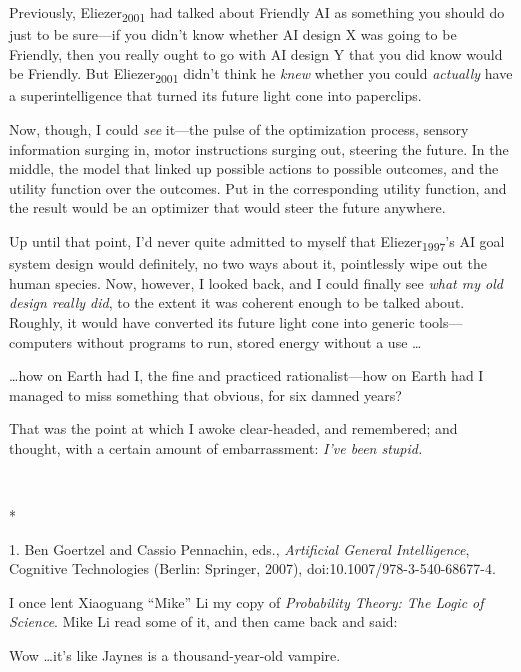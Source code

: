 {
 Previously, Eliezer\textsubscript{2001} had talked about Friendly
AI as something you should do just to be sure---if you
didn't know whether AI design X was going to be
Friendly, then you really ought to go with AI design Y that you did
know would be Friendly. But Eliezer\textsubscript{2001}
didn't think he \textit{knew} whether you could
\textit{actually} have a superintelligence that turned its future light
cone into paperclips.}

{
 Now, though, I could \textit{see} it---the pulse of the
optimization process, sensory information surging in, motor
instructions surging out, steering the future. In the middle, the model
that linked up possible actions to possible outcomes, and the utility
function over the outcomes. Put in the corresponding utility function,
and the result would be an optimizer that would steer the future
anywhere.}

{
 Up until that point, I'd never quite admitted to
myself that Eliezer\textsubscript{1997}'s AI goal
system design would definitely, no two ways about it, pointlessly wipe
out the human species. Now, however, I looked back, and I could finally
see \textit{what my old design really did}, to the extent it was
coherent enough to be talked about. Roughly, it would have converted
its future light cone into generic tools---computers without programs
to run, stored energy without a use \ldots}

{
 \ldots how on Earth had I, the fine and practiced rationalist---how
on Earth had I managed to miss something that obvious, for six damned
years?}

{
 That was the point at which I awoke clear-headed, and remembered;
and thought, with a certain amount of embarrassment:
\textit{I've been stupid.}}

{\centering
 \ ~
\par}

{\centering
 *
\par}


\bigskip

{
 1. Ben Goertzel and Cassio Pennachin, eds., \textit{Artificial
General Intelligence}, Cognitive Technologies (Berlin: Springer, 2007),
doi:10.1007/978-3-540-68677-4.}


{
 I once lent Xiaoguang ``Mike''
Li my copy of \textit{Probability Theory: The Logic of Science}. Mike
Li read some of it, and then came back and said:}

{
 Wow \ldots it's like Jaynes is a thousand-year-old
vampire.}

